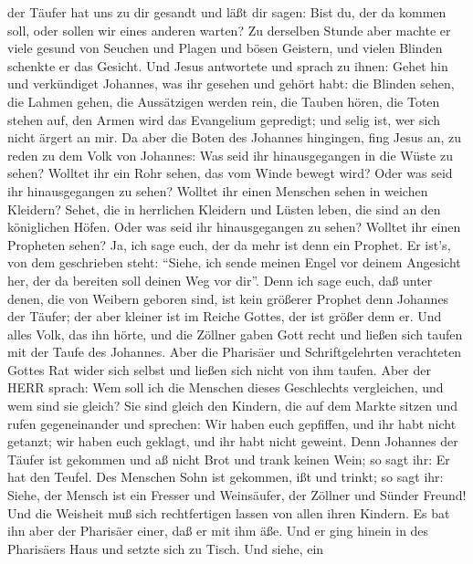 der Täufer hat uns zu dir gesandt und läßt dir sagen: Bist du, der da
kommen soll, oder sollen wir eines anderen warten?  Zu
derselben Stunde aber machte er viele gesund von Seuchen und Plagen und
bösen Geistern, und vielen Blinden schenkte er das Gesicht.
 Und Jesus antwortete und sprach zu ihnen: Gehet hin und
verkündiget Johannes, was ihr gesehen und gehört habt: die Blinden
sehen, die Lahmen gehen, die Aussätzigen werden rein, die Tauben hören,
die Toten stehen auf, den Armen wird das Evangelium gepredigt;
 und selig ist, wer sich nicht ärgert an mir. 
Da aber die Boten des Johannes hingingen, fing Jesus an, zu reden zu dem
Volk von Johannes: Was seid ihr hinausgegangen in die Wüste zu sehen?
Wolltet ihr ein Rohr sehen, das vom Winde bewegt wird? 
Oder was seid ihr hinausgegangen zu sehen? Wolltet ihr einen Menschen
sehen in weichen Kleidern? Sehet, die in herrlichen Kleidern und Lüsten
leben, die sind an den königlichen Höfen.  Oder was seid
ihr hinausgegangen zu sehen? Wolltet ihr einen Propheten sehen? Ja, ich
sage euch, der da mehr ist denn ein Prophet.  Er ist's, von
dem geschrieben steht: ``Siehe, ich sende meinen Engel vor deinem
Angesicht her, der da bereiten soll deinen Weg vor dir''. 
Denn ich sage euch, daß unter denen, die von Weibern geboren sind, ist
kein größerer Prophet denn Johannes der Täufer; der aber kleiner ist im
Reiche Gottes, der ist größer denn er.  Und alles Volk, das
ihn hörte, und die Zöllner gaben Gott recht und ließen sich taufen mit
der Taufe des Johannes.  Aber die Pharisäer und
Schriftgelehrten verachteten Gottes Rat wider sich selbst und ließen
sich nicht von ihm taufen.  Aber der HERR sprach: Wem soll
ich die Menschen dieses Geschlechts vergleichen, und wem sind sie
gleich?  Sie sind gleich den Kindern, die auf dem Markte
sitzen und rufen gegeneinander und sprechen: Wir haben euch gepfiffen,
und ihr habt nicht getanzt; wir haben euch geklagt, und ihr habt nicht
geweint.  Denn Johannes der Täufer ist gekommen und aß
nicht Brot und trank keinen Wein; so sagt ihr: Er hat den Teufel.
 Des Menschen Sohn ist gekommen, ißt und trinkt; so sagt
ihr: Siehe, der Mensch ist ein Fresser und Weinsäufer, der Zöllner und
Sünder Freund!  Und die Weisheit muß sich rechtfertigen
lassen von allen ihren Kindern.  Es bat ihn aber der
Pharisäer einer, daß er mit ihm äße. Und er ging hinein in des
Pharisäers Haus und setzte sich zu Tisch.  Und siehe, ein
